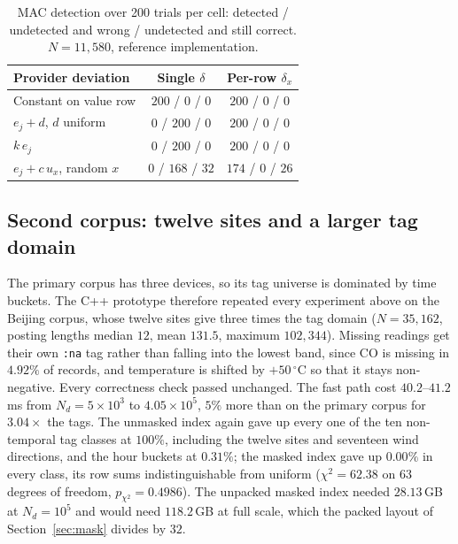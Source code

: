 \documentclass[a4paper,fleqn]{cas-sc}
\begin{document}
\begin{table}[pos=htbp]
\caption{MAC detection over 200 trials per cell: detected / undetected and
wrong / undetected and still correct. $N=11{,}580$, reference
implementation.}
\label{tab:mac}
\centering
\footnotesize
\setlength{\tabcolsep}{3pt}
\begin{tabular*}{\tblwidth}{@{\extracolsep{\fill}}lcc@{}}
\toprule
Provider deviation & Single $\delta$ & Per-row $\delta_x$ \\
\midrule
Constant on value row & $200$ / $0$ / $0$ & $200$ / $0$ / $0$ \\
$e_j+d$, $d$ uniform & $0$ / $200$ / $0$ & $200$ / $0$ / $0$ \\
$k\,e_j$ & $0$ / $200$ / $0$ & $200$ / $0$ / $0$ \\
$e_j+c\,u_x$, random $x$ & $0$ / $168$ / $32$ & $174$ / $0$ / $26$ \\
\bottomrule
\end{tabular*}
\end{table}

\subsection{Second corpus: twelve sites and a larger tag domain}
\label{sec:secondcorpus}
The primary corpus has three devices, so its tag universe is dominated by time
buckets. The C++ prototype therefore repeated every experiment above on the
Beijing corpus, whose twelve sites give three times the tag domain
($N=35{,}162$, posting lengths median $12$, mean $131.5$, maximum $102{,}344$).
Missing readings get their own \texttt{:na} tag rather than falling into the
lowest band, since CO is missing in $4.92\%$ of records, and temperature is
shifted by $+50\,^\circ$C so that it stays non-negative. Every correctness
check passed unchanged. The fast path cost $40.2$--$41.2$\,ms from
$N_d=5\times10^3$ to $4.05\times10^5$, $5\%$ more than on the primary corpus for
$3.04\times$ the tags. The unmasked index again gave up every one of the ten
non-temporal tag classes at $100\%$, including the twelve sites and seventeen
wind directions, and the hour buckets at $0.31\%$; the masked index gave up
$0.00\%$ in every class, its row sums indistinguishable from uniform
($\chi^2=62.38$ on $63$ degrees of freedom, $p_{\chi^2}=0.4986$). The unpacked
masked index needed $28.13$\,GB at $N_d=10^5$ and would need $118.2$\,GB at
full scale, which the packed layout of Section~\ref{sec:mask} divides by $32$.
\end{document}
